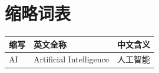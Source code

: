 \chapter*{缩略词表}

\begin{longtable}{lll}
\toprule
缩写 & 英文全称 & 中文含义 \\
\midrule
AI & Artificial Intelligence & 人工智能 \\
\bottomrule
\end{longtable}
